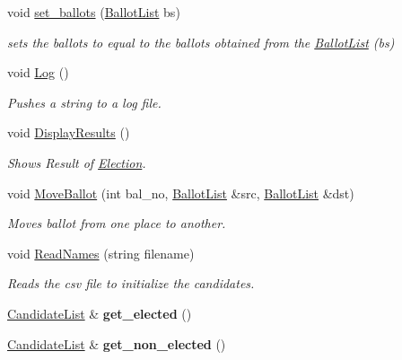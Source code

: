 \begin{DoxyCompactItemize}
void \mbox{\hyperlink{class_election_a4bf9c6eb717929f143ea89718cb09fe9}{set\+\_\+ballots}} (\mbox{\hyperlink{class_ballot_list}{Ballot\+List}} bs)
\begin{DoxyCompactList}\small\item\em sets the ballots to equal to the ballots obtained from the \mbox{\hyperlink{class_ballot_list}{Ballot\+List}} (bs) \end{DoxyCompactList}\item 
\mbox{\label{class_election_a70752317f5b403a3e779b3bf2a8c91f6}} 
void \mbox{\hyperlink{class_election_a70752317f5b403a3e779b3bf2a8c91f6}{Log}} ()
\begin{DoxyCompactList}\small\item\em Pushes a string to a log file. \end{DoxyCompactList}\item 
\mbox{\label{class_election_a769bc27e7ab0a091eee5d11f3b382032}} 
void \mbox{\hyperlink{class_election_a769bc27e7ab0a091eee5d11f3b382032}{Display\+Results}} ()
\begin{DoxyCompactList}\small\item\em Shows Result of \mbox{\hyperlink{class_election}{Election}}. \end{DoxyCompactList}\item 
void \mbox{\hyperlink{class_election_ad9b7c2ce89047e79429c6ba00f428343}{Move\+Ballot}} (int bal\+\_\+no, \mbox{\hyperlink{class_ballot_list}{Ballot\+List}} \&src, \mbox{\hyperlink{class_ballot_list}{Ballot\+List}} \&dst)
\begin{DoxyCompactList}\small\item\em Moves ballot from one place to another. \end{DoxyCompactList}\item 
\mbox{\label{class_election_ad8977ccd4118d7995bf286886759bbcf}} 
void \mbox{\hyperlink{class_election_ad8977ccd4118d7995bf286886759bbcf}{Read\+Names}} (string filename)
\begin{DoxyCompactList}\small\item\em Reads the csv file to initialize the candidates. \end{DoxyCompactList}\item 
\mbox{\label{class_election_a4b5e266bd47407f7401825a00ddf9dfe}} 
\mbox{\hyperlink{class_candidate_list}{Candidate\+List}} \& {\bfseries get\+\_\+elected} ()
\item 
\mbox{\label{class_election_a30145af53c1a39812e9b4fc6e53ebeb0}} 
\mbox{\hyperlink{class_candidate_list}{Candidate\+List}} \& {\bfseries get\+\_\+non\+\_\+elected} ()
\end{DoxyCompactItemize}


